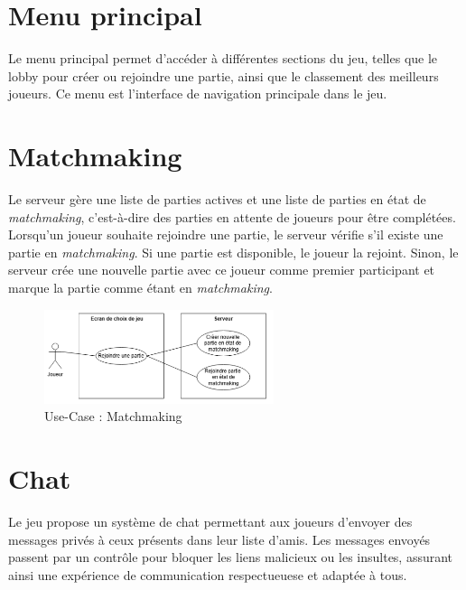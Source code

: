 \documentclass{report}
\begin{document}
\section{Menu principal}

\noindent Le menu principal permet d'accéder à différentes sections du jeu, telles que le lobby pour créer ou rejoindre une partie, ainsi que le classement des meilleurs joueurs. Ce menu est l'interface de navigation principale dans le jeu.

\section{Matchmaking}

\noindent Le serveur gère une liste de parties actives et une liste de parties en état de \emph{matchmaking}, c’est-à-dire des parties en attente de joueurs pour être complétées. Lorsqu'un joueur souhaite rejoindre une partie, le serveur vérifie s'il existe une partie en \emph{matchmaking}. Si une partie est disponible, le joueur la rejoint. Sinon, le serveur crée une nouvelle partie avec ce joueur comme premier participant et marque la partie comme étant en \emph{matchmaking}.

\vspace{-1em}

\begin{figure}[H]
    \centering
     \includegraphics[width=0.6\textwidth, keepaspectratio]{src/design/matchmaking.png}
    \caption{Use-Case : Matchmaking}
    \label{fig:use_case_matchmaking}
\end{figure}

\section{Chat}

\noindent Le jeu propose un système de chat permettant aux joueurs d'envoyer des messages privés à ceux présents dans leur liste d'amis. Les messages envoyés passent par un contrôle pour bloquer les liens malicieux ou les insultes, assurant ainsi une expérience de communication respectueuese et adaptée à tous.
\end{document}
